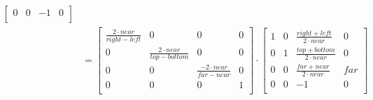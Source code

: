 \documentclass{article}
\begin{document}
\begin{equation*}
\begin{split}
\begin{bmatrix}
        0 & 0 & -1 & 0\\    
    \end{bmatrix}
    \\&=
    \begin{bmatrix}
        \frac{2\cdot near}{right-left} &
        0 & 0 & 0\\
        0 &
        \frac{2\cdot near}{top-bottom} & 0
        & 0\\
        0 & 0 &
        \frac{-2 \cdot near}{far-near} & 0\\
        0 & 0 & 0 & 1\\    
    \end{bmatrix}\cdot
    \begin{bmatrix}
        1 &
        0 & 
        \frac{right+left}{2\cdot near}
        & 0\\
        0 &
        1 &
        \frac{top+bottom}{2\cdot near}
        & 0\\
        0 & 0 &
        \frac{far+near}{2\cdot near}
        & far\\
        0 & 0 & -1 & 0\\    
    \end{bmatrix}
\end{split}
\end{equation*}
\end{document}
